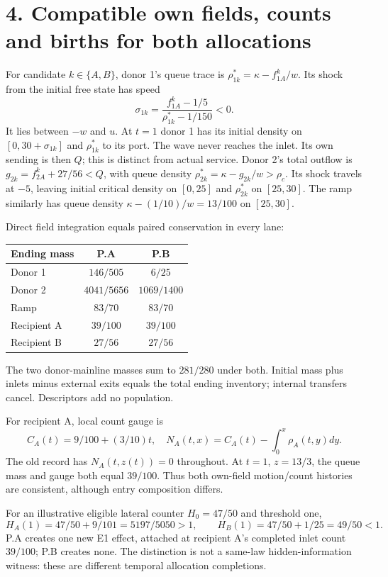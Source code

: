 \documentclass[11pt,a4paper]{article}
\begin{document}
\newpage
\section*{4. Compatible own fields, counts and births for both allocations}
For candidate $k\in\{A,B\}$, donor 1's queue trace is
$\rho_{1k}^*=\kappa-f_{1A}^{k}/w$. Its shock from the initial free state has
speed
\begin{equation}
 \sigma_{1k}=\frac{f_{1A}^{k}-1/5}{\rho_{1k}^*-1/150}<0.
\end{equation}
It lies between $-w$ and $u$. At $t=1$ donor 1 has its initial density on
$[0,30+\sigma_{1k}]$ and $\rho_{1k}^*$ to its port. The wave never reaches
the inlet. Its own sending is then $Q$; this is distinct from actual service.
Donor 2's total outflow is $g_{2k}=f_{2A}^k+27/56<Q$, with queue density
$\rho_{2k}^*=\kappa-g_{2k}/w>\rho_c$. Its shock travels at $-5$, leaving
initial critical density on $[0,25]$ and $\rho_{2k}^*$ on $[25,30]$.
The ramp similarly has queue density $\kappa-(1/10)/w=13/100$ on $[25,30]$.

Direct field integration equals paired conservation in every lane:
\begin{center}
\begin{tabular}{lcc}
\toprule
Ending mass & P.A & P.B\\
\midrule
Donor 1 & $146/505$ & $6/25$\\
Donor 2 & $4041/5656$ & $1069/1400$\\
Ramp & $83/70$ & $83/70$\\
Recipient A & $39/100$ & $39/100$\\
Recipient B & $27/56$ & $27/56$\\
\bottomrule
\end{tabular}
\end{center}
The two donor-mainline masses sum to $281/280$ under both. Initial mass plus
inlets minus external exits equals the total ending inventory; internal
transfers cancel. Descriptors add no population.

For recipient A, local count gauge is
\begin{equation}
 C_A(t)=9/100+(3/10)t,\quad
 N_A(t,x)=C_A(t)-\int_0^x\rho_A(t,y)dy.
\end{equation}
The old record has $N_A(t,z(t))=0$ throughout. At $t=1$, $z=13/3$, the queue
mass and gauge both equal $39/100$. Thus both own-field motion/count histories
are consistent, although entry composition differs.

For an illustrative eligible lateral counter $H_0=47/50$ and threshold one,
\begin{equation}
 H_A(1)=47/50+9/101=5197/5050>1,\qquad
 H_B(1)=47/50+1/25=49/50<1.
\end{equation}
P.A creates one new E1 effect, attached at recipient A's completed inlet count
$39/100$; P.B creates none. The distinction is not a same-law hidden-information
witness: these are different temporal allocation completions.
\end{document}
